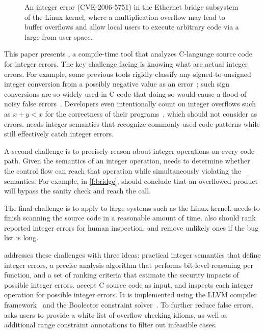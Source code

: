 \begin{figure}[t]
\centering

\vspace{-1em}
\caption{An integer error (CVE-2006-5751) in the Ethernet
bridge subsystem of the Linux kernel, where a multiplication overflow
may lead to buffer overflows and allow local users to execute
arbitrary code via a large  from user space.
}
\label{f:bridge}
\end{figure}


This paper presents \sys, a compile-time tool that analyzes C-language
source code for integer errors.
%
The key challenge facing \sys is knowing what are actual integer
errors.
For example, some previous tools
rigidly classify any signed-to-unsigned integer conversion from a
possibly negative value as an error~\cite{brumley:rich, moy:z3prefix,
seacord:secure-c}; such sign conversions are so widely used in C
code that doing so would cause a flood of noisy false
errors~\cite[\subsectionautorefname~6.2]{moy:z3prefix}.
Developers even intentionally count on integer overflows
such as $x + y < x$ for the correctness of their programs~\cite{ioc},
which \sys should not consider as errors.
\sys needs integer semantics that recognize commonly used code
patterns while still effectively catch integer errors.

A second challenge is to precisely reason about integer operations
on every code path.  Given the semantics of an integer operation,
\sys needs to determine whether the control flow can reach that
operation while simultaneously violating the semantics.  For
example, in \autoref{f:bridge}, \sys should conclude that an overflowed
product  will bypass the sanity check and reach the
 call.

The final challenge is to apply \sys to large systems such as the
Linux kernel.  \sys needs to finish scanning the source code in a
reasonable amount of time.  \sys also should rank reported integer
errors for human inspection, and remove unlikely ones if the bug
list is long.

\sys addresses these challenges with three ideas: practical integer
semantics that define integer errors, a precise analysis algorithm
that performs bit-level reasoning per function, and a set of ranking
criteria that estimate the security impacts of possible integer
errors.  \sys accept C source code as input, and inspects each
integer operation for possible integer errors.
%
It is implemented using the LLVM compiler framework~\cite{lattner:llvm}
and the Boolector constraint solver~\cite{boolector}.
%
To further reduce false errors, \sys asks users to provide a white
list of overflow checking idioms, as well as additional range
constraint annotations to filter out infeasible cases.

